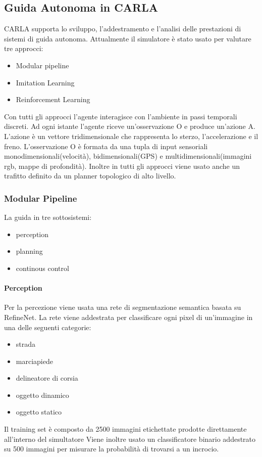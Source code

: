 \subsection{Guida Autonoma in CARLA}
CARLA supporta lo sviluppo, l'addestramento e l'analisi delle prestazioni di sistemi di guida autonoma.
Attualmente il simulatore è stato usato per valutare tre approcci:
\begin{itemize}
    \item Modular pipeline
    \item Imitation Learning
    \item Reinforcement Learning
\end{itemize}
Con tutti gli approcci l'agente interagisce con l'ambiente in passi temporali discreti. Ad ogni istante  l'agente riceve un'osservazione O e produce un'azione 
A. L'azione è un vettore tridimensionale che rappresenta lo sterzo, l'accelerazione e il freno. L'osservazione O è formata da una tupla di input
sensoriali monodimensionali(velocità), bidimensionali(GPS) e multidimensionali(immagini rgb, mappe di profondità). Inoltre in tutti gli approcci viene usato
anche un trafitto definito da un planner topologico di alto livello.

\subsubsection{Modular Pipeline}
La guida in tre sottosistemi:
\begin{itemize}
    \item perception
    \item planning
    \item continous control
\end{itemize}

\paragraph{Perception} Per la percezione viene usata una rete di segmentazione semantica basata su RefineNet. La rete viene addestrata per classificare ogni
pixel di un'immagine in una delle seguenti categorie:
\begin{itemize}
    \item strada
    \item marciapiede
    \item delineatore di corsia
    \item oggetto dinamico
    \item oggetto statico
\end{itemize}
Il training set è composto da 2500 immagini etichettate prodotte direttamente all'interno del simultatore
Viene inoltre usato un classificatore binario addestrato su 500 immagini per misurare la probabilità di trovarsi a un incrocio.
